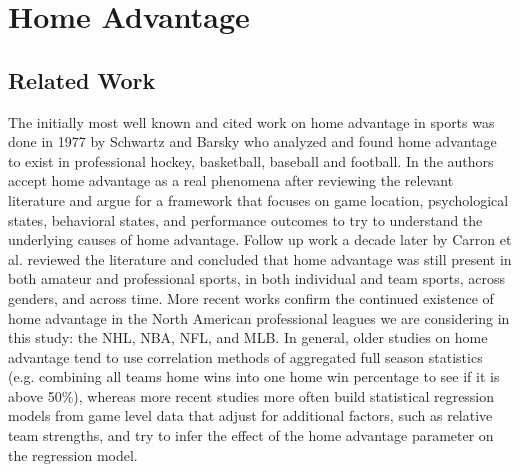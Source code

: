 \section{Home Advantage}
\subsection{Related Work}

The initially most well known and cited work on home advantage in sports was done in 1977 by Schwartz and Barsky \cite{Schwartz1977} who analyzed and found home advantage to exist in professional hockey, basketball, baseball and football. In \cite{Courneya1992} the authors accept home advantage as a real phenomena after reviewing the relevant literature and argue for a framework that focuses on game location, psychological states, behavioral states, and performance outcomes to try to understand the underlying causes of home advantage. Follow up work a decade later by Carron et al. \cite{Carron2005} reviewed the literature and concluded that home advantage was still present in both amateur and professional sports, in both individual and team sports, across genders, and across time. More recent works \cite{Pollard2005a} \cite{Gomez2011} confirm the continued existence of home advantage in the North American professional leagues we are considering in this study: the NHL, NBA, NFL, and MLB. In general, older studies on home advantage tend to use correlation methods of aggregated full season statistics (e.g. combining all teams home wins into one home win percentage to see if it is above 50\%), whereas more recent studies more often build statistical regression models from game level data that adjust for additional factors, such as relative team strengths, and try to infer the effect of the home advantage parameter on the regression model.

